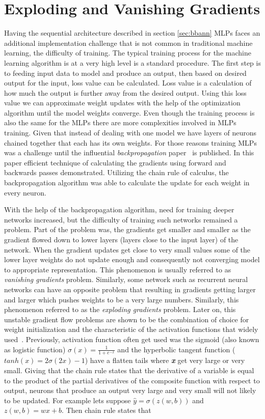 \section{Exploding and Vanishing Gradients} \label{sec:gradients}
Having the sequential architecture described in section \ref{sec:bbann} MLPs faces an additional implementation challenge that is not common in traditional machine learning, the difficulty of training. 
The typical training process for the machine learning algorithm is at a very high level is a standard procedure.  
The first step is to feeding input data to model and produce an output, then based on desired output for the input, loss value can be calculated.
Loss value is a calculation of how much the output is further away from the desired output. 
Using this loss value we can approximate weight updates with the help of the optimization algorithm until the model weights converge.
Even though the training process is also the same for the MLPs there are more complexities involved in MLPs training. 
Given that instead of dealing with one model we have layers of neurons chained together that each has its own weights. 
For those reasons training MLPs was a challenge until the influential \emph{backpropagation} paper~\cite{backprop} is published. In this paper efficient technique of calculating the gradients using forward and backwards passes demonstrated.
Utilizing the chain rule of calculus, the backpropagation algorithm was able to calculate the update for each weight in every neuron.

With the  help of the backpropagation algorithm, need for training deeper networks increased, but the difficulty of training such networks remained a problem.
Part of the problem was, the gradients get smaller and smaller as the gradient flowed down to lower layers (layers close to the input layer) of the network. 
When the gradient updates get close to very small values some of the lower layer weights do not update enough and consequently not converging model to appropriate representation.
This phenomenon is usually referred to as \emph{vanishing gradients} problem.
Similarly, some network such as recurrent neural networks can have an opposite problem that resulting in gradients getting larger and larger which pushes weights to be a very large numbers. 
Similarly, this phenomenon referred to as the \emph{exploding gradients} problem.
Later on, this unstable gradient flow problems are shown to be the combination of choice for weight initialization and the characteristic of the activation functions that widely used~\cite{vanishgrads}.
Previously, activation function often get used was the sigmoid (also known as logistic function) \(\sigma(x) = \frac{1}{1 + e^{-x}}\) and the hyperbolic tangent function (\(tanh(x) = 2\sigma(2x) -1\)) have a flatten tails where \textbf{\textit{x}} get very large or very small. 
Giving that the chain rule states that the derivative of a variable is equal to the product of the partial derivatives of the composite function with respect to output, neurons that produce an output very large and very small will not likely to be updated. 
For example lets suppose \(\hat{y} = \sigma(z(w, b))\) and \(z(w, b) = wx + b\). Then chain rule states that

